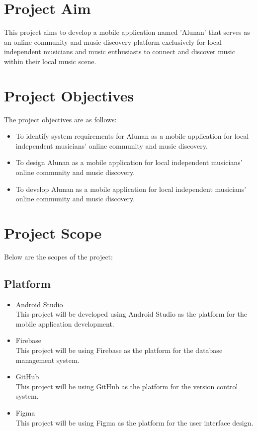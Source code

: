 \section{Project Aim}
This project aims to develop a mobile application named 'Alunan' that serves as an online community and music discovery platform exclusively for local independent musicians and music enthusiasts to connect and discover music within their local music scene.

\section{Project Objectives}
The project objectives are as follows:
\begin{itemize}
    \item To identify system requirements for Alunan as a mobile application for local independent musicians' online community and music discovery.
    \item To design Alunan as a mobile application for local independent musicians' online community and music discovery.
    \item To develop Alunan as a mobile application for local independent musicians' online community and music discovery.
\end{itemize}
\pagebreak

\section{Project Scope}
Below are the scopes of the project:

\subsection{Platform}
\begin{itemize}
    \item Android Studio\\
    This project will be developed using Android Studio as the platform for the mobile application development.
    \item Firebase\\
    This project will be using Firebase as the platform for the database management system.
    \item GitHub\\
    This project will be using GitHub as the platform for the version control system.
    \item Figma\\
    This project will be using Figma as the platform for the user interface design.
\end{itemize}

